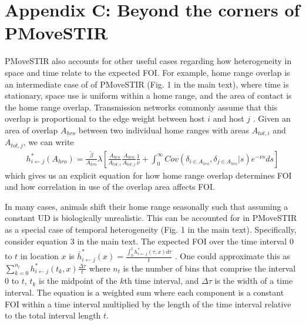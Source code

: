 \documentclass[11pt]{article}
\begin{document}


\section*{Appendix C: Beyond the corners of PMoveSTIR}

PMoveSTIR also accounts for other useful cases regarding how heterogeneity in space and time relate to the expected FOI. For example, home range overlap is an intermediate case of of PMoveSTIR (Fig. 1 in the main text), where time is stationary, space use is uniform within a home range, and the area of contact is the home range overlap.  
Transmission networks commonly assume that this overlap is proportional to the edge weight between host $i$ and host $j$ \citep[e.g.][]{Springer2017a}. 
Given an area of overlap $A_{hro}$ between two individual home ranges with areas $A_{tot, i}$ and $A_{tot, j}$, we can write
\begin{equation}
    \begin{aligned}
    h^*_{i \leftarrow j}(A_{hro}) = \frac{\tilde{\beta}}{A_{hro}} \lambda \left[\frac{A_{hro}}{A_{tot, i}} \frac{A_{hro}}{A_{tot, j}}  \frac{1}{\nu} + \int_{0}^{\infty} Cov(\delta_{i \in A_{hro}}, \delta_{j \in A_{hro}} | s) e^{-\nu s} ds\right]
    \end{aligned}
    \label{eq:home_range}
\end{equation}
which gives us an explicit equation for how home range overlap determines FOI and how correlation in use of the overlap area affects FOI. 

In many cases, animals shift their home range seasonally \citep{Viana2018,Richard2014} such that assuming a constant UD is biologically unrealistic. This can be accounted for in PMoveSTIR as a special case of temporal heterogeneity (Fig. 1 in the main text).  Specifically, consider equation 3 in the main text. The expected FOI over the time interval 0 to $t$ in location $x$ is $\bar{h}^*_{i \leftarrow j}(x) = \frac{\int_0^t h^*_{i \leftarrow j}(\tau, x) d\tau}{t}$ \citep{Wilber2022}.  One could approximate this as $\sum_{k = 0}^{n_t} h^*_{i \leftarrow j}(t_k, x) \frac{\Delta \tau}{t}$ where $n_t$ is the number of bins that comprise the interval 0 to $t$, $t_k$ is the midpoint of the $k$th time interval, and $\Delta \tau$ is the width of a time interval.  The equation is a weighted sum where each component is a constant FOI within a time interval multiplied by the length of the time interval relative to the total interval length $t$.  
\end{document}
